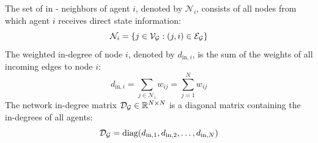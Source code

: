 \begin{definition}\label{def:neighbor_set}
The set of in - neighbors of agent $i$, denoted by $\mathcal{N}_i$, consists of all nodes from which agent $i$ receives direct state information:
\begin{equation}
    \mathcal{N}_i = \{j \in {\mathcal{V}}_{\mathcal{G}} : (j, i) \in {\mathcal{E}}_{\mathcal{G}}\}
\end{equation}
The weighted in-degree of node $i$, denoted by $d_{\text{in}, i}$, is the sum of the weights of all incoming edges to node $i$:
\begin{equation}
    d_{\text{in}, i} = \sum_{j \in \mathcal{N}_i} w_{ij} = \sum_{j=1}^{N} w_{ij}
\end{equation}
The network in-degree matrix ${\mathcal{D}}_{\mathcal{G}} \in \mathbb{R}^{N \times N}$ is a diagonal matrix containing the in-degrees of all agents:
\begin{equation}\label{eq:indegree_matrix}
    {\mathcal{D}}_{\mathcal{G}} = \text{diag}(d_{\text{in}, 1}, d_{\text{in}, 2}, \dots, d_{\text{in}, N})
\end{equation}
\end{definition}

